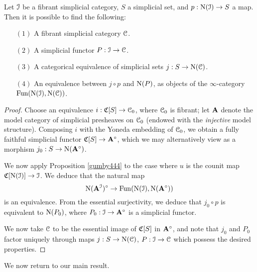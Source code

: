 \begin{corollary}\label{strictify}
Let $\operatorname{\mathcal{I}}$ be a fibrant simplicial category, $S$ a simplicial
set, and $p: \operatorname{N}(\operatorname{\mathcal{I}}) \rightarrow S$ a map. Then it is possible to find the following:
\begin{itemize}
\item[$(1)$] A fibrant simplicial category $\operatorname{\mathcal{C}}$.
\item[$(2)$] A simplicial functor $P: \operatorname{\mathcal{I}} \rightarrow \operatorname{\mathcal{C}}$.
\item[$(3)$] A categorical equivalence of simplicial sets
$j: S \rightarrow \operatorname{N}(\operatorname{\mathcal{C}})$.
\item[$(4)$] An equivalence between $j \circ p$ and $\operatorname{N}(P)$, as objects of the
$\infty$-category $\operatorname{Fun}( \operatorname{N}(\operatorname{\mathcal{I}}), \operatorname{N}(\operatorname{\mathcal{C}}))$.
\end{itemize}
\end{corollary}

\begin{proof}
Choose an equivalence $i: \operatorname{\mathfrak{C}}[S] \rightarrow \operatorname{\mathcal{C}}_0$, where
$\operatorname{\mathcal{C}}_0$ is fibrant; let ${\mathbf A}$ denote the model category of
simplicial presheaves on $\operatorname{\mathcal{C}}_0$ (endowed with the {\em injective} model structure). Composing $i$ with the Yoneda
embedding of $\operatorname{\mathcal{C}}_0$, we obtain a fully faithful simplicial
functor $\operatorname{\mathfrak{C}}[S] \rightarrow {\mathbf A}^{\circ}$, which we may
alternatively view as a morphism $j_0: S \rightarrow \operatorname{N}
({\mathbf A}^{\circ})$.

We now apply Proposition \ref{gumby444} to the case where $u$ is the
counit map $\operatorname{\mathfrak{C}}[\operatorname{N}(\operatorname{\mathcal{I}})] \rightarrow
\operatorname{\mathcal{I}}$. We deduce that the natural map
$$ \operatorname{N} ({\mathbf A}^{\operatorname{\mathcal{I}}})^{\circ} \rightarrow \operatorname{Fun}( \operatorname{N}(\operatorname{\mathcal{I}}), \operatorname{N}({\mathbf A}^{\circ}
) )$$ is an equivalence. From the essential
surjectivity, we deduce that $j_0 \circ p$ is equivalent to
$\operatorname{N}(P_0)$, where $P_0: \operatorname{\mathcal{I}} \rightarrow {\mathbf A}^{\circ}$ is a
simplicial functor.

We now take $\operatorname{\mathcal{C}}$ to be the essential image of $\operatorname{\mathfrak{C}}[S]$ in
${\mathbf A}^{\circ}$, and note that $j_0$ and $P_0$ factor uniquely
through maps $j: S \rightarrow \operatorname{N}(\operatorname{\mathcal{C}})$, $P: \operatorname{\mathcal{I}}
\rightarrow \operatorname{\mathcal{C}}$ which possess the desired properties.
\end{proof}

We now return to our main result.

